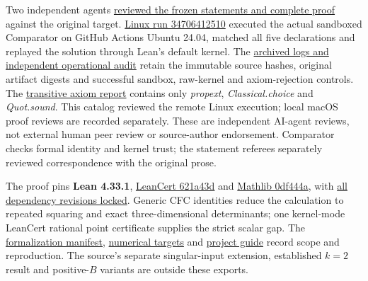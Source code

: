 \documentclass[11pt,a4paper]{article}
\begin{document}
Two independent agents
\href{https://github.com/ajt60gaibb/OpenProblemsInNLA/blob/main/matrix-inequalities-and-norms/MI-29/lean/reviews}{reviewed
the frozen statements and complete proof} against the original target.
\href{https://github.com/sgstepaniants/OpenProblemsInNLA/actions/runs/34706412510}{Linux
run 34706412510} executed the actual sandboxed Comparator on GitHub
Actions Ubuntu 24.04, matched all five declarations and replayed the
solution through Lean's default kernel. The
\href{https://github.com/ajt60gaibb/OpenProblemsInNLA/blob/main/matrix-inequalities-and-norms/MI-29/lean/verification/linux-2026-09-12}{archived
logs and independent operational audit} retain the immutable source
hashes, original artifact digests and successful sandbox, raw-kernel and
axiom-rejection controls. The
\href{https://github.com/ajt60gaibb/OpenProblemsInNLA/blob/main/matrix-inequalities-and-norms/MI-29/lean/reviews/proof-axioms.log}{transitive
axiom report} contains only \textit{propext}, \textit{Classical.choice}
and \textit{Quot.sound}. This catalog reviewed the remote Linux
execution; local macOS proof reviews are recorded separately. These are
independent AI-agent reviews, not external human peer review or
source-author endorsement. Comparator checks formal identity and kernel
trust; the statement referees separately reviewed correspondence with
the original prose.

The proof pins \textbf{Lean 4.33.1},
\href{https://github.com/alerad/leancert/tree/621a43d7cf21f87872392a01e874f2f1dbddc926}{LeanCert
621a43d} and
\href{https://github.com/leanprover-community/mathlib4/tree/0df444a360eaa60ab8c11dca51a86af692955474}{Mathlib
0df444a}, with
\href{https://github.com/ajt60gaibb/OpenProblemsInNLA/blob/main/matrix-inequalities-and-norms/MI-29/lean/lake-manifest.json}{all
dependency revisions locked}. Generic CFC identities reduce the
calculation to repeated squaring and exact three-dimensional
determinants; one kernel-mode LeanCert rational point certificate
supplies the strict scalar gap. The
\href{https://github.com/ajt60gaibb/OpenProblemsInNLA/blob/main/matrix-inequalities-and-norms/MI-29/lean/formalization.yaml}{formalization
manifest},
\href{https://github.com/ajt60gaibb/OpenProblemsInNLA/blob/main/matrix-inequalities-and-norms/MI-29/lean/NUMERICAL_TARGETS.md}{numerical
targets} and
\href{https://github.com/ajt60gaibb/OpenProblemsInNLA/blob/main/matrix-inequalities-and-norms/MI-29/lean/README.md}{project
guide} record scope and reproduction. The source's separate
singular-input extension, established \(k=2\) result and positive-\(B\)
variants are outside these exports.
\end{document}
